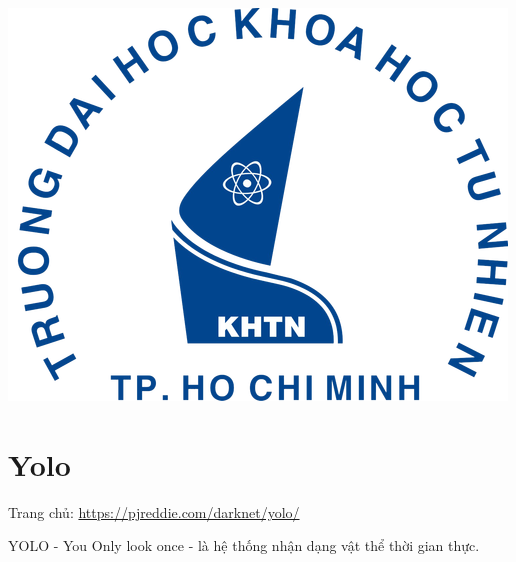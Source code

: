 \begin{titlepage}



\includegraphics{logo/rsz_3logo-khtn.png}\\[1cm] %
 

\vfill %

\end{titlepage}


\section{Yolo}

Trang chủ: \url{https://pjreddie.com/darknet/yolo/} 

YOLO - You Only look once - là hệ thống nhận dạng vật thể thời gian thực.

